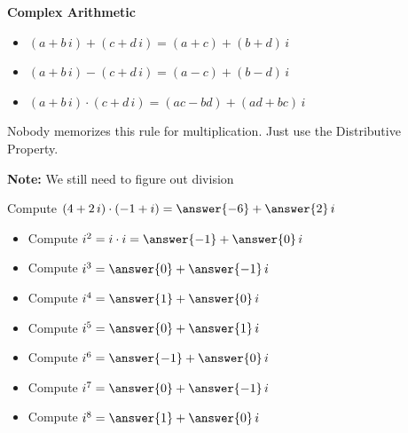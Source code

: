 \documentclass{ximera}
\begin{document}
\begin{definition}  \textbf{\textcolor{green!50!black}{Complex Arithmetic}} 



\begin{itemize}
\item $ (a + b \, i) + (c + d \, i) = (a+c) + (b+d) \, i$
\item $ (a + b \, i) - (c + d \, i) = (a-c) + (b-d) \, i$
\item $ (a + b \, i) \cdot (c + d \, i) = (ac-bd) + (ad+bc) \, i$
\end{itemize}


Nobody memorizes this rule for multiplication.  Just use the Distributive Property.

\end{definition}









\textbf{Note:} We still need to figure out division






\begin{question}


Compute   $(4 + 2 \, i) \cdot (-1 + i) = \answer{-6} + \answer{2} \, i$

\end{question}





\begin{question}


\begin{itemize}
\item Compute   $i^2 = i \cdot i = \answer{-1} + \answer{0} \, i$
\item Compute   $i^3 =  \answer{0} + \answer{-1} \, i$
\item Compute   $i^4 =  \answer{1} + \answer{0} \, i$
\item Compute   $i^5 =  \answer{0} + \answer{1} \, i$
\item Compute   $i^6 =  \answer{-1} + \answer{0} \, i$
\item Compute   $i^7 =  \answer{0} + \answer{-1} \, i$
\item Compute   $i^8 =  \answer{1} + \answer{0} \, i$
\end{itemize}

\end{question}
\end{document}
